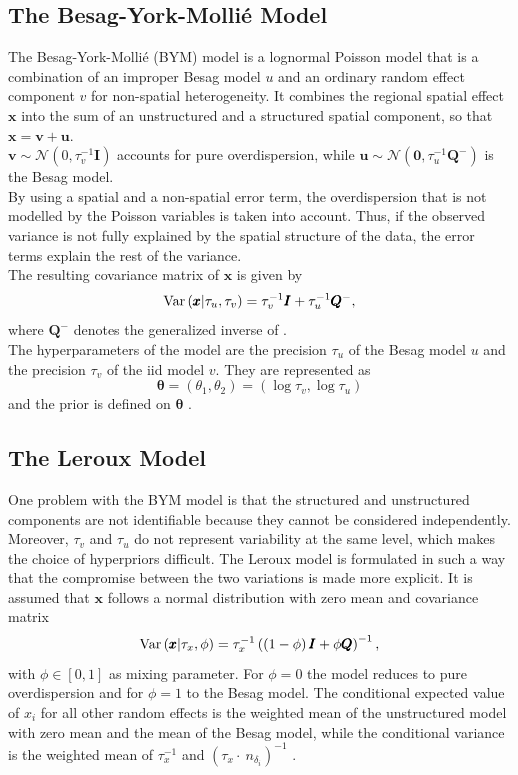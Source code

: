\subsection{The Besag-York-Mollié Model}\label{sec:bym}
The Besag-York-Mollié (BYM) model is a lognormal Poisson model that is a combination of an improper Besag model $u$ and an ordinary random effect component $v$ for non-spatial heterogeneity. It combines the regional spatial effect $\pmb{x}$ into the sum of an unstructured and a structured spatial component, so that $\pmb{x}=\pmb{v}+\pmb{u}$.\\
$\pmb{v}\sim\mathcal{N}\left(0,\tau_v^{-1}\pmb{I}\right)$ accounts for pure overdispersion, while $\pmb{u}\sim\mathcal{N}\left(\pmb{0}, \tau_u^{-1}\pmb{Q}^{-}\right)$ is the Besag model. \\
By using a spatial and a non-spatial error term, the overdispersion that is not modelled by the Poisson variables is taken into account. Thus, if the observed variance is not fully explained by the spatial structure of the data, the error terms explain the rest of the variance. \\
The resulting covariance matrix of $\pmb{x}$ is given by
\begin{equation}
    \hbox{Var}\left(\pmb{x}|\tau_u,\tau_v\right)=\tau_v^{-1}\pmb{I}+\tau_u^{-1}\pmb{Q}^{-},
\end{equation}
where $\pmb{Q}^{-}$ denotes the generalized inverse of . \\
The hyperparameters of the model are the precision $\tau_u$ of the Besag model $u$ and the precision $\tau_v$ of the iid model $v$. They are represented as
\begin{equation}
    \pmb{\theta}=\left(\theta_1, \theta_2\right)=\left(\log\tau_v,\log\tau_u\right)
\end{equation}
and the prior is defined on $\pmb{\theta}$ \autocite[][]{besag1991bayesian, riebler2016intuitive}.
\subsection{The Leroux Model}\label{sec:leroux}
One problem with the BYM model is that the structured and unstructured components are not identifiable because they cannot be considered independently. Moreover, $\tau_v$ and $\tau_u$ do not represent variability at the same level, which makes the choice of hyperpriors difficult. The Leroux model is formulated in such a way that the compromise between the two variations is made more explicit. It is assumed that $\pmb{x}$ follows a normal distribution with zero mean and covariance matrix
\begin{equation}
    \hbox{Var}\left(\pmb{x}|\tau_x,\phi\right)=\tau_x^{-1}\left(\left(1-\phi\right)\pmb{I}+\phi\pmb{Q}\right)^{-1},
\end{equation}
with $\phi\in\left[0,1\right]$ as mixing parameter. For $\phi=0$ the model reduces to pure overdispersion and for $\phi=1$ to the Besag model. The conditional expected value of $x_i$ for all other random effects is the weighted mean of the unstructured model with zero mean and the mean of the Besag model, while the conditional variance is the weighted mean of $\tau_x^{-1}$ and $\left(\tau_x\cdot\ n_{\delta_i}\right)^{-1}$ \autocite[][]{leroux2000estimation, riebler2016intuitive}.
